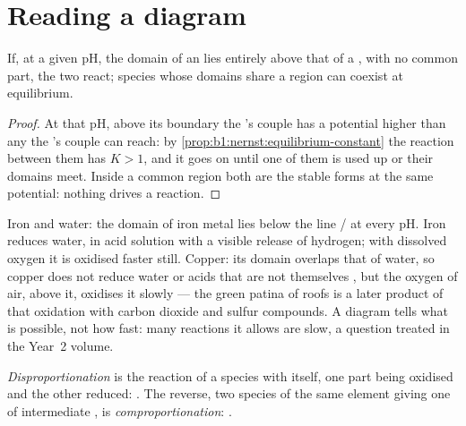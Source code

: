\section{Reading a diagram}\label{sec:b1:e-ph-diagrams:reading}

\begin{proposition}\label{prop:b1:e-ph-diagrams:disjoint-domains}
If, at a given pH, the domain of an  lies entirely above that of
a , with no common part, the two react; species whose domains
share a region can coexist at equilibrium.
\end{proposition}

\begin{proof}
At that pH, above its boundary the 's couple has a potential
higher than any the 's couple can reach: by
\cref{prop:b1:nernst:equilibrium-constant} the reaction between them has
$K > 1$, and it goes on until one of them is used up or their domains
meet. Inside a common region both are the stable forms at the same
potential: nothing drives a reaction.
\end{proof}

Iron and water: the domain of iron metal lies below the line
/ at every pH. Iron reduces water, in acid solution with
a visible release of hydrogen; with dissolved oxygen it is oxidised
faster still. Copper: its domain overlaps that of water, so copper does
not reduce water or acids that are not themselves , but the
oxygen of air, above it, oxidises it slowly --- the green patina of roofs
is a later product of that oxidation with carbon dioxide and sulfur
compounds. A diagram tells what is possible, not how fast: many reactions
it allows are slow, a question treated in the Year~2 volume.

\begin{definition}\label{def:b1:e-ph-diagrams:disproportionation}
\emph{Disproportionation} is the reaction of a
species with itself, one part being oxidised and the other reduced:
. The reverse, two species of the same element
giving one of intermediate , is
\emph{comproportionation}:
.
\end{definition}

